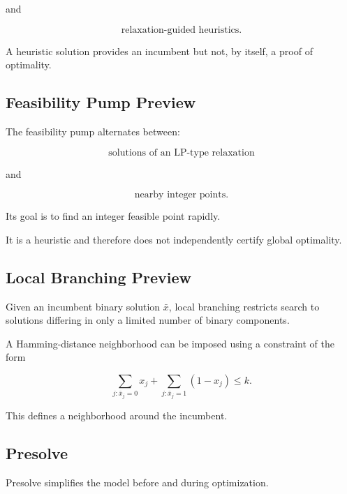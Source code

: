 and

\[
\boxed{
\text{relaxation-guided heuristics}.
}
\]

A heuristic solution provides an incumbent but not, by itself, a proof of
optimality.

\subsection{Feasibility Pump Preview}
\label{subsec:feasibility-pump-preview}

The feasibility pump alternates between:

\[
\boxed{
\text{solutions of an LP-type relaxation}
}
\]

and

\[
\boxed{
\text{nearby integer points}.
}
\]

Its goal is to find an integer feasible point rapidly.

It is a heuristic and therefore does not independently certify global
optimality.

\subsection{Local Branching Preview}
\label{subsec:local-branching-preview}

Given an incumbent binary solution \(\bar{x}\), local branching restricts
search to solutions differing in only a limited number of binary
components.

A Hamming-distance neighborhood can be imposed using a constraint of the
form

\[
\boxed{
\sum_{j:\bar{x}_j=0}
x_j
+
\sum_{j:\bar{x}_j=1}
(1-x_j)
\leq
k.
}
\]

This defines a neighborhood around the incumbent.

\subsection{Presolve}
\label{subsec:integer-presolve}

Presolve simplifies the model before and during optimization.

